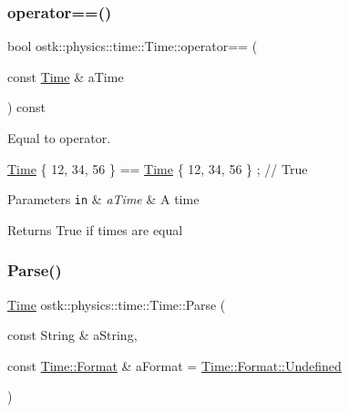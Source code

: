 \subsubsection{\texorpdfstring{operator==()}{operator==()}}
{\footnotesize\ttfamily bool ostk\+::physics\+::time\+::\+Time\+::operator== (\begin{DoxyParamCaption}\item[{const \hyperlink{classostk_1_1physics_1_1time_1_1_time}{Time} \&}]{a\+Time }\end{DoxyParamCaption}) const}



Equal to operator. 


\begin{DoxyCode}
\hyperlink{classostk_1_1physics_1_1time_1_1_time_a9609e75d328ed240f6fc4529e26038cc}{Time} \{ 12, 34, 56 \}  == \hyperlink{classostk_1_1physics_1_1time_1_1_time_a9609e75d328ed240f6fc4529e26038cc}{Time} \{ 12, 34, 56 \}  ; \textcolor{comment}{// True}
\end{DoxyCode}



\begin{DoxyParams}[1]{Parameters}
\mbox{\tt in}  & {\em a\+Time} & A time \\
\hline
\end{DoxyParams}
\begin{DoxyReturn}{Returns}
True if times are equal 
\end{DoxyReturn}
\mbox{\label{classostk_1_1physics_1_1time_1_1_time_a475b2b6200f15f20c8fab3891bbb73ac}} 
\subsubsection{\texorpdfstring{Parse()}{Parse()}}
{\footnotesize\ttfamily \hyperlink{classostk_1_1physics_1_1time_1_1_time}{Time} ostk\+::physics\+::time\+::\+Time\+::\+Parse (\begin{DoxyParamCaption}\item[{const String \&}]{a\+String,  }\item[{const \hyperlink{classostk_1_1physics_1_1time_1_1_time_a207e776746c45c3aaffcf7112b2bc951}{Time\+::\+Format} \&}]{a\+Format = {\ttfamily \hyperlink{classostk_1_1physics_1_1time_1_1_time_a207e776746c45c3aaffcf7112b2bc951aec0fc0100c4fc1ce4eea230c3dc10360}{Time\+::\+Format\+::\+Undefined}} }\end{DoxyParamCaption})\hspace{0.3cm}{\ttfamily [static]}}



